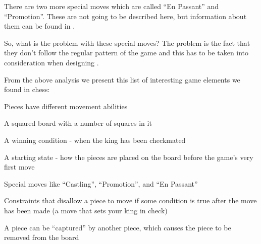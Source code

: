 There are two more special moves which are called ``En Passant'' and
``Promotion''. These are not going to be described here, but information about
them can be found in \cite{chessrules}. 

So, what is the problem with these special moves? The problem is the fact that
they don't follow the regular pattern of the game and this has to be taken into
consideration when designing \productname{}.


From the above analysis we present this list of interesting game elements we found 
in chess:

\begin{dlist}
\item Pieces have different movement abilities
\item A squared board with a number of squares in it
\item A winning condition - when the king has been checkmated
\item A starting state - how the pieces are placed on the board before the
  game's very first move
\item Special moves like ``Castling'', ``Promotion'', and ``En Passant''
\item Constraints that disallow a piece to move if some condition is true after
  the move has been made (a move that sets your king in check)
\item A piece can be ``captured'' by another piece, which causes the piece to be
  removed from the board
\end{dlist}
